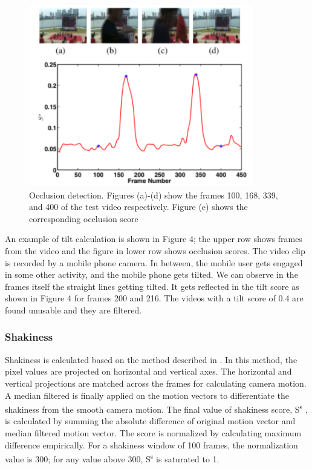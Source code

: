 \documentclass{sig-alternate-05-2015}
\begin{document}
\begin{figure}
\centering
\includegraphics[scale=1]{img3.png}
\caption{Occlusion detection. Figures (a)-(d) show the frames
100, 168, 339, and 400 of the test video respectively. Figure (e)
shows the corresponding occlusion score}
\end{figure}

An example of tilt calculation is shown in Figure 4; the upper
row shows frames from the video and the figure in lower row shows
occlusion scores. The video clip is recorded by a mobile phone
camera. In between, the mobile user gets engaged in some other
activity, and the mobile phone gets tilted. We can observe in the
frames itself the straight lines getting tilted. It gets reflected in the
tilt score as shown in Figure 4 for frames 200 and 216. The videos
with a tilt score of 0.4 are found unusable and they are filtered.


\subsubsection{Shakiness}
Shakiness is calculated based on the method described in \cite{4}.
In this method, the pixel values are projected on horizontal and
vertical axes. The horizontal and vertical projections are matched
across the frames for calculating camera motion. A median filtered
is finally applied on the motion vectors to differentiate the shakiness from the smooth camera motion. The final value of shakiness
score, S\textsuperscript{s} , is calculated by summing the absolute difference of original motion vector and median filtered motion vector. The score is
normalized by calculating maximum difference empirically. For a
shakiness window of 100 frames, the normalization value is 300;
for any value above 300, S\textsuperscript{s} is saturated to 1.
\end{document}
